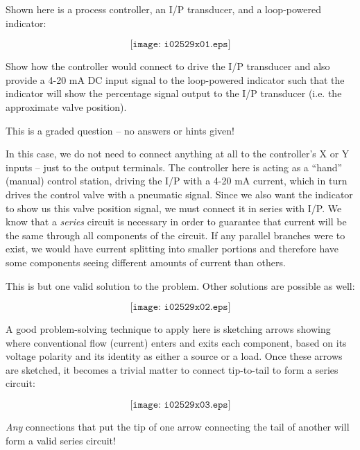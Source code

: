 

Shown here is a process controller, an I/P transducer, and a loop-powered indicator:

\vskip 20pt

$$\texttt{[image: i02529x01.eps]}$$

Show how the controller would connect to drive the I/P transducer and also provide a 4-20 mA DC input signal to the loop-powered indicator such that the indicator will show the percentage signal output to the I/P transducer (i.e. the approximate valve position).

\vfil 

\eject






This is a graded question -- no answers or hints given!







In this case, we do not need to connect anything at all to the controller's X or Y inputs -- just to the output terminals.  The controller here is acting as a ``hand'' (manual) control station, driving the I/P with a 4-20 mA current, which in turn drives the control valve with a pneumatic signal.  Since we also want the indicator to show us this valve position signal, we must connect it in series with I/P.  We know that a {\it series} circuit is necessary in order to guarantee that current will be the same through all components of the circuit.  If any parallel branches were to exist, we would have current splitting into smaller portions and therefore have some components seeing different amounts of current than others.

\vskip 10pt

This is but one valid solution to the problem.  Other solutions are possible as well:

$$\texttt{[image: i02529x02.eps]}$$

\filbreak

A good problem-solving technique to apply here is sketching arrows showing where conventional flow (current) enters and exits each component, based on its voltage polarity and its identity as either a source or a load.  Once these arrows are sketched, it becomes a trivial matter to connect tip-to-tail to form a series circuit:

$$\texttt{[image: i02529x03.eps]}$$

{\it Any} connections that put the tip of one arrow connecting the tail of another will form a valid series circuit!





